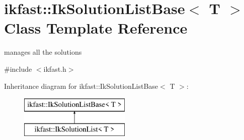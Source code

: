 \hypertarget{classikfast_1_1IkSolutionListBase}{\section{ikfast\-:\-:Ik\-Solution\-List\-Base$<$ T $>$ Class Template Reference}
\label{classikfast_1_1IkSolutionListBase}
}


manages all the solutions  




{\ttfamily \#include $<$ikfast.\-h$>$}

Inheritance diagram for ikfast\-:\-:Ik\-Solution\-List\-Base$<$ T $>$\-:\begin{figure}[H]
\begin{center}
\leavevmode
\includegraphics[height=2.000000cm]{classikfast_1_1IkSolutionListBase}
\end{center}
\end{figure}
